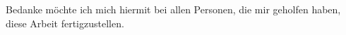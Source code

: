 \chapter*{\acknowledgementslabel}

Bedanke möchte ich mich hiermit bei allen Personen, die mir geholfen haben, diese Arbeit fertigzustellen.